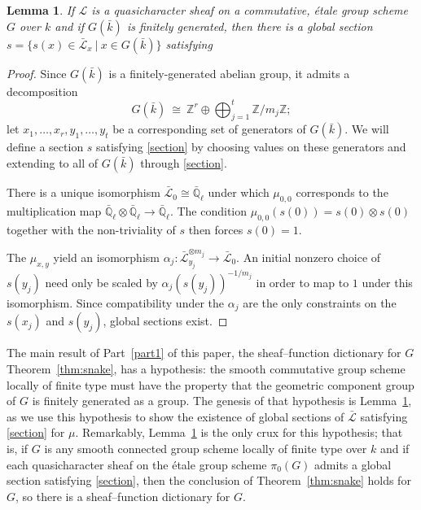 \documentclass[11pt]{amsart}
\theoremstyle{plain}
\newtheorem{lemma}[theorem]{Lemma}
\theoremstyle{definition}
\theoremstyle{remark}
\newcommand{\ZZ}{{\mathbb{Z}}}
\newcommand{\EE}{\mathbb{\bar Q}_\ell}
\newcommand{\bFq}{\bar{k}}
\newcommand{\Fq}{k}
\newcommand{\tq}{{\ \vert\ }}
\newcommand{\iso}{{\ \cong\ }}
\newcommand{\qcs}[1]{{\mathcal{#1}}}
\newcommand{\gqcs}[1]{{\mathcal{\bar #1}}}
\begin{document}
\begin{lemma}\label{lemma:section}
 If $\qcs{L}$ is a quasicharacter sheaf on a commutative, \'etale group scheme $G$
 over $\Fq$ and if $G(\bFq)$ is finitely generated, then there is a global section
 $s = \{ s(x) \in \gqcs{L}_x \tq x \in G(\bFq) \}$ satisfying
 \begin{equation}\label{section}
 \end{equation}
\end{lemma}

\begin{proof}
  Since $G(\bFq)$ is a finitely-generated abelian group, it admits a decomposition
  \[
  G(\bFq) \iso \ZZ^r \oplus \bigoplus_{j=1}^t \ZZ / m_j \ZZ;
  \]
  let $x_1, \ldots, x_r, y_1, \ldots, y_t$ be a corresponding set of generators of $G(\bFq)$.
  We will define a section $s$ satisfying \eqref{section} by choosing values on these generators and extending to all
  of $G(\bFq)$ through \eqref{section}.
  
  There is a unique isomorphism $\gqcs{L}_0 \cong \EE$ under which $\mu_{0,0}$ corresponds
  to the multiplication map $\EE \otimes\EE \to \EE$.
  The condition $\mu_{0,0}(s(0)) = s(0) \otimes s(0)$ together with the non-triviality of $s$
  then forces $s(0) = 1$.
  
  The $\mu_{x,y}$ yield an isomorphism $\alpha_j : \gqcs{L}_{y_j}^{\otimes m_j} \to \gqcs{L}_0$.
  An initial nonzero choice of $s(y_j)$ need only be scaled by $\alpha_j(s(y_j))^{-1/m_j}$ in order to map to
  $1$ under this isomorphism.  Since compatibility under the $\alpha_j$ are the only constraints on the
  $s(x_j)$ and $s(y_j)$, global sections exist.
\end{proof}

The main result of Part~\ref{part1} of this paper, 
the sheaf--function dictionary for $G$ Theorem~\ref{thm:snake}, has a hypothesis: 
the smooth commutative group scheme locally of finite type must have the 
property that the geometric component group of $G$ is finitely generated as a group. 
The genesis of that hypothesis is Lemma~\ref{lemma:section},
as we use this hypothesis to show the existence of global sections of $\gqcs{L}$ satisfying \eqref{section} for $\mu$.
Remarkably, Lemma~\ref{lemma:section} is the only crux for this hypothesis;
that is, if $G$ is any smooth connected group scheme locally of finite type over $\Fq$
and if each quasicharacter sheaf on the \'etale group scheme $\pi_0(G)$ admits a global section 
satisfying \eqref{section}, then the conclusion of Theorem~\ref{thm:snake} holds for $G$,
so there is a sheaf--function dictionary for $G$.
\end{document}
